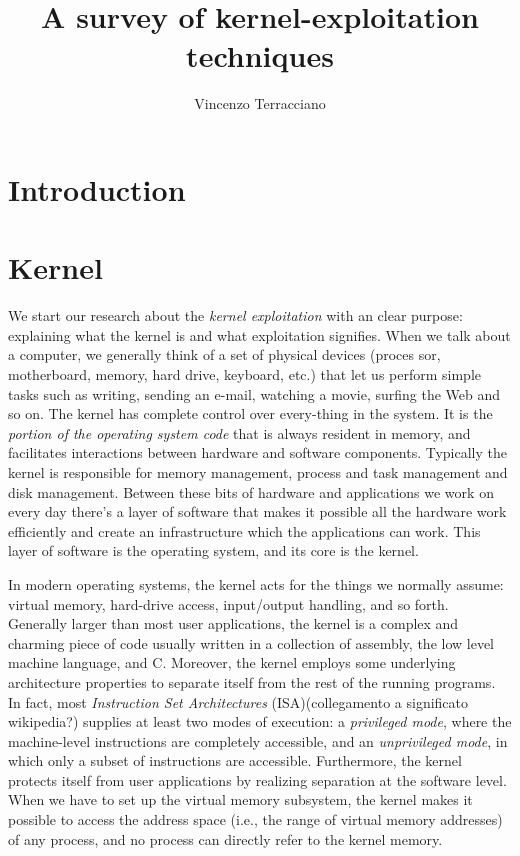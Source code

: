 \documentclass{masterthesis}
\begin{document}
\title{A survey of kernel-exploitation techniques}

\author{Vincenzo Terracciano}


\examiner{_______ ______}

\maketitle

\tableofcontents

\chapter{Introduction}

\chapter{Kernel}
\label{ch:kernel}

We start our research about the \emph{kernel exploitation} with an clear purpose: explaining what the kernel is and what exploitation signifies.
When we talk about a computer, we generally think of a set of physical devices (proces sor, motherboard, memory, hard drive, keyboard, etc.) that let us  perform simple tasks such as writing, sending an e-mail, watching a movie, surfing the Web and so on. 
The kernel has complete control over every-thing in the system. It is the \emph{portion of the operating system code} that is always resident in memory, and facilitates interactions between hardware and software components.
Typically the kernel is responsible for memory management, process and task management and disk management.
Between these bits of hardware and applications we work on every day there's a layer of software that makes it possible all the hardware work efficiently and create an infrastructure which the applications can work.
This layer of software is the operating system, and its core is the kernel.

In modern operating systems, the kernel acts for the things we normally assume: virtual memory, hard-drive access, input/output handling, and so forth. Generally larger than most user applications, the kernel is a complex and charming piece of code usually written in a collection of assembly, the low level machine language, and C. 
Moreover, the kernel employs some underlying architecture properties to separate itself from the rest of the running programs.
In fact, most \emph{Instruction Set Architectures} (ISA)(collegamento a significato wikipedia?) supplies at least two modes of execution: a \emph{privileged mode}, where the machine-level instructions are completely accessible, and an \emph{unprivileged mode}, in which only a subset of instructions are accessible. 
Furthermore, the kernel protects itself from user applications by realizing separation at the software level.
When we have to set up the virtual memory subsystem, the kernel makes it possible to access the address space (i.e., the range of virtual memory addresses) of any process, and no process can directly refer to the kernel memory.
\end{document}
